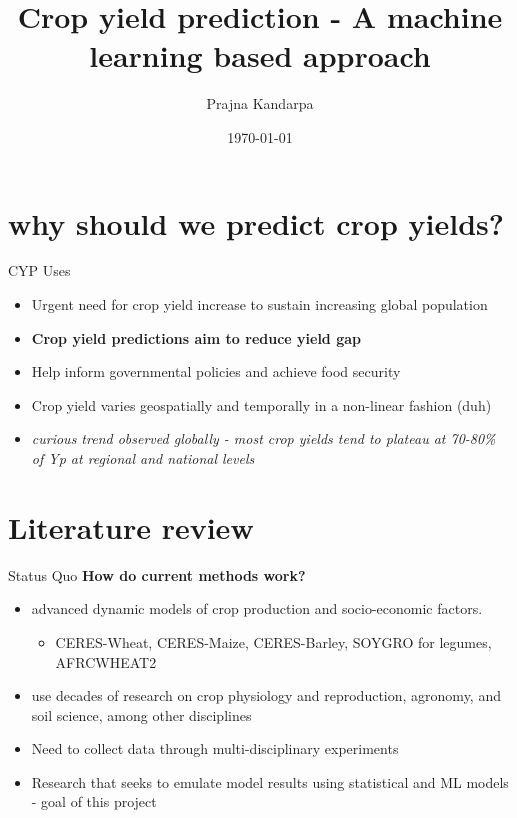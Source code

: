 \documentclass[10pt]{beamer}
\title{Crop yield prediction - A machine learning based approach}
\date{\today}
\author{Prajna Kandarpa}
\institute{University of Waterloo}
\begin{document}
  \maketitle
  \section{why should we predict crop yields?}
  \begin{frame}{CYP Uses}
  	\begin{itemize}
  		\item Urgent need for crop yield increase to sustain increasing global population \cite{Lobell2010}
  		\item \textbf{Crop yield predictions aim to reduce yield gap}
  		\item Help inform governmental policies and achieve food security
  		\item Crop yield varies geospatially and temporally in a non-linear fashion (duh)
  		\item \emph{curious trend observed globally - most crop yields tend to plateau at 70-80\% of Yp at regional and national levels}
  	\end{itemize}
  \end{frame}
  \section{Literature review}
  \begin{frame}{Status Quo}
  	\textbf{How do current methods work?}
  	\begin{itemize}
		\item{advanced dynamic models of crop production and socio-economic factors.}
	    	\begin{itemize}
	    		\item CERES-Wheat, CERES-Maize, CERES-Barley, SOYGRO for legumes, AFRCWHEAT2 \cite{SJAR4439}
    		\end{itemize}
		\item use decades of research on crop physiology and reproduction, agronomy, and soil science, among other disciplines
		\item Need to collect data through multi-disciplinary experiments
		\item Research that seeks to emulate model results using statistical and ML models - goal of this project
	\end{itemize}
  \end{frame}
\end{document}

